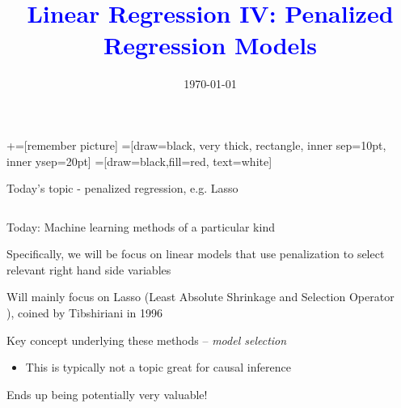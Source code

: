 \documentclass[notes,11pt, aspectratio=169]{beamer}
\title[]{\textcolor{blue}{Linear Regression IV: Penalized Regression Models }}
\author[PGP]{}
\institute[FRBNY]{\small{Paul Goldsmith-Pinkham}}
\date{\today}
\newenvironment{wideitemize}{\itemize\addtolength{\itemsep}{10pt}}{\enditemize}
\begin{document}
\newcommand\marktopleft[1]{%
    \tikz[overlay,remember picture] 
        \node (marker-#1-a) at (-.3em,.3em) {};%
}
\newcommand\markbottomright[2]{%
    \tikz[overlay,remember picture] 
        \node (marker-#1-b) at (0em,0em) {};%
}
+=[remember picture] 
 =[draw=black, very thick, rectangle, inner sep=10pt, inner ysep=20pt]
 =[draw=black,fill=red, text=white]

\begin{frame}
\maketitle

\end{frame}


\begin{frame}{Today's topic - penalized regression, e.g. Lasso}
  \begin{columns}[T] %
    \begin{column}{.8\textwidth}
      \begin{wideitemize}
      \item Today: Machine learning methods of a particular kind
      \item Specifically, we will be focus on linear models that use
        penalization to select relevant right hand side variables
      \item Will mainly focus on Lasso (Least Absolute Shrinkage and
        Selection Operator ), coined by Tibshiriani in 1996
      \item Key concept underlying these methods -- \emph{model selection}
        \begin{itemize}
        \item This is typically not a topic great for causal inference
        \end{itemize}
      \item Ends up being potentially very valuable!
      \end{wideitemize}
    \end{column}%
  \hfill%
  \begin{column}{.5\textwidth}
  \end{column}
\end{columns}
\end{frame}
\end{document}
